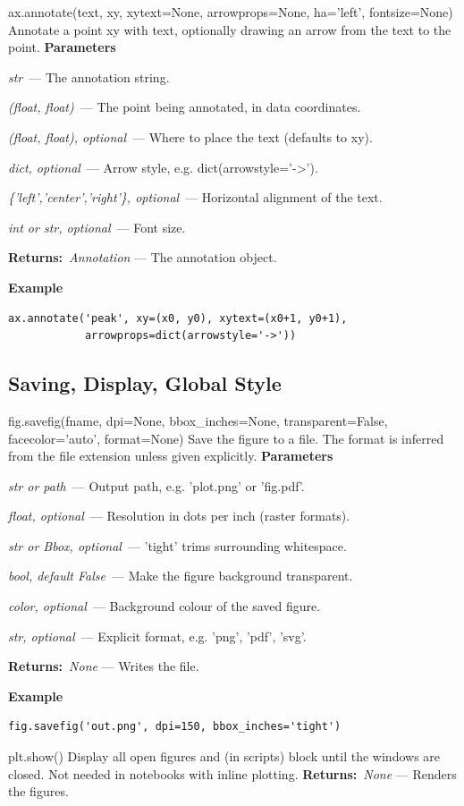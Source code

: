 \documentclass[10pt]{article}
\newenvironment{params}
  {\smallskip\textbf{\small\color{accent}Parameters}\par\nopagebreak
   \begin{description}[leftmargin=1.3em,itemsep=1.5pt,parsep=0pt,topsep=1pt,
      labelindent=0pt,style=sameline,font=\normalfont]}
  {\end{description}}
\newcommand{\pitem}[3]{\item[{\ttfamily\color{accent}#1}]{\itshape #2}\ --- #3}
\newcommand{\preturn}[2]{\smallskip\textbf{\small\color{accent}Returns:}\ {\itshape #1} --- #2\par}
\begin{document}
\begin{func}{ax.annotate(text, xy, xytext=None, arrowprops=None, ha='left', fontsize=None)}
Annotate a point xy with text, optionally drawing an arrow from the text to the point.
\begin{params}
\pitem{text}{str}{The annotation string.}
\pitem{xy}{(float, float)}{The point being annotated, in data coordinates.}
\pitem{xytext}{(float, float), optional}{Where to place the text (defaults to xy).}
\pitem{arrowprops}{dict, optional}{Arrow style, e.g. dict(arrowstyle='->').}
\pitem{ha}{\{'left','center','right'\}, optional}{Horizontal alignment of the text.}
\pitem{fontsize}{int or str, optional}{Font size.}
\end{params}
\preturn{Annotation}{The annotation object.}
\smallskip\textbf{\small\color{accent}Example}
\begin{lstlisting}[style=py]
ax.annotate('peak', xy=(x0, y0), xytext=(x0+1, y0+1),
            arrowprops=dict(arrowstyle='->'))
\end{lstlisting}
\end{func}
\medskip

\subsection{Saving, Display, Global Style}
\begin{func}{fig.savefig(fname, dpi=None, bbox\_inches=None, transparent=False, facecolor='auto', format=None)}
Save the figure to a file. The format is inferred from the file extension unless given explicitly.
\begin{params}
\pitem{fname}{str or path}{Output path, e.g. 'plot.png' or 'fig.pdf'.}
\pitem{dpi}{float, optional}{Resolution in dots per inch (raster formats).}
\pitem{bbox\_inches}{str or Bbox, optional}{'tight' trims surrounding whitespace.}
\pitem{transparent}{bool, default False}{Make the figure background transparent.}
\pitem{facecolor}{color, optional}{Background colour of the saved figure.}
\pitem{format}{str, optional}{Explicit format, e.g. 'png', 'pdf', 'svg'.}
\end{params}
\preturn{None}{Writes the file.}
\smallskip\textbf{\small\color{accent}Example}
\begin{lstlisting}[style=py]
fig.savefig('out.png', dpi=150, bbox_inches='tight')
\end{lstlisting}
\end{func}
\medskip

\begin{func}{plt.show()}
Display all open figures and (in scripts) block until the windows are closed. Not needed in notebooks with inline plotting.
\preturn{None}{Renders the figures.}
\end{func}
\medskip
\end{document}
